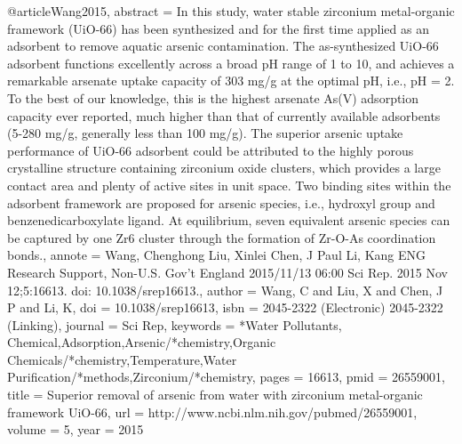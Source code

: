 @article{Wang2015,
abstract = {In this study, water stable zirconium metal-organic framework (UiO-66) has been synthesized and for the first time applied as an adsorbent to remove aquatic arsenic contamination. The as-synthesized UiO-66 adsorbent functions excellently across a broad pH range of 1 to 10, and achieves a remarkable arsenate uptake capacity of 303 mg/g at the optimal pH, i.e., pH = 2. To the best of our knowledge, this is the highest arsenate As(V) adsorption capacity ever reported, much higher than that of currently available adsorbents (5-280 mg/g, generally less than 100 mg/g). The superior arsenic uptake performance of UiO-66 adsorbent could be attributed to the highly porous crystalline structure containing zirconium oxide clusters, which provides a large contact area and plenty of active sites in unit space. Two binding sites within the adsorbent framework are proposed for arsenic species, i.e., hydroxyl group and benzenedicarboxylate ligand. At equilibrium, seven equivalent arsenic species can be captured by one Zr6 cluster through the formation of Zr-O-As coordination bonds.},
annote = {Wang, Chenghong
Liu, Xinlei
Chen, J Paul
Li, Kang
ENG
Research Support, Non-U.S. Gov't
England
2015/11/13 06:00
Sci Rep. 2015 Nov 12;5:16613. doi: 10.1038/srep16613.},
author = {Wang, C and Liu, X and Chen, J P and Li, K},
doi = {10.1038/srep16613},
isbn = {2045-2322 (Electronic)
2045-2322 (Linking)},
journal = {Sci Rep},
keywords = {*Water Pollutants, Chemical,Adsorption,Arsenic/*chemistry,Organic Chemicals/*chemistry,Temperature,Water Purification/*methods,Zirconium/*chemistry},
pages = {16613},
pmid = {26559001},
title = {{Superior removal of arsenic from water with zirconium metal-organic framework UiO-66}},
url = {http://www.ncbi.nlm.nih.gov/pubmed/26559001},
volume = {5},
year = {2015}
}
